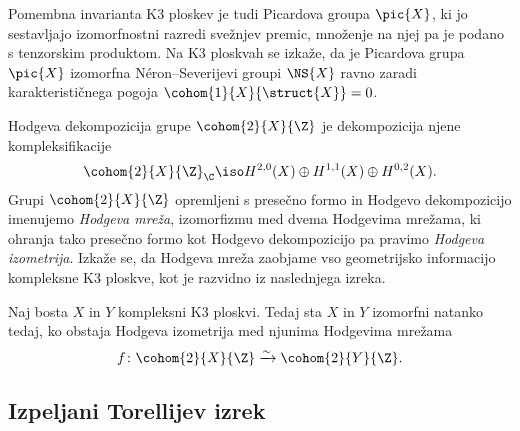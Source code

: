 Pomembna invarianta K3 ploskev je tudi Picardova groupa $\pic{X}$, ki jo sestavljajo izomorfnostni razredi svežnjev premic, množenje na njej pa je podano s tenzorskim produktom. Na K3 ploskvah se izkaže, da je Picardova grupa $\pic{X}$ izomorfna Néron--Severijevi groupi $\NS{X}$ ravno zaradi karakterističnega pogoja $\cohom{1}{X}{\struct{X}} = 0$. 

Hodgeva dekompozicija grupe $\cohom{2}{X}{\Z}$ je dekompozicija njene kompleksifikacije
\[
    \cohom{2}{X}{\Z}_\C \iso H^{2,0}(X) \oplus H^{1,1}(X) \oplus H^{0,2}(X).
\]
Grupi $\cohom{2}{X}{\Z}$ opremljeni s presečno formo in Hodgevo dekompozicijo imenujemo \emph{Hodgeva mreža}, izomorfizmu med dvema Hodgevima mrežama, ki ohranja tako presečno formo kot Hodgevo dekompozicijo pa pravimo \emph{Hodgeva izometrija}. Izkaže se, da Hodgeva mreža zaobjame vso geometrijsko informacijo kompleksne K3 ploskve, kot je razvidno iz naslednjega izreka. 

\begin{izrek}
    Naj bosta $X$ in $Y$ kompleksni K3 ploskvi. Tedaj sta $X$ in $Y$ izomorfni natanko tedaj, ko obstaja Hodgeva izometrija med njunima Hodgevima mrežama
    \[
        f\colon \cohom{2}{X}{\Z} \xrightarrow{\sim} \cohom{2}{Y}{\Z}.
    \]
\end{izrek}


\subsection*{Izpeljani Torellijev izrek}


